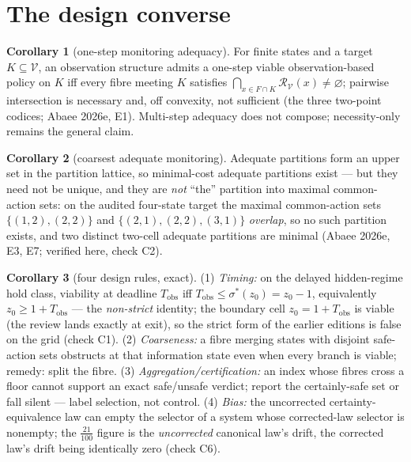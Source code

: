 \documentclass[10pt,twocolumn]{article}
\theoremstyle{definition}
\newtheorem{corollary}{Corollary}
\begin{document}
\section{The design converse}

\begin{corollary}[one-step monitoring adequacy]\label{cor:C}
For finite states and a target $K \subseteq \mathcal{V}$, an observation
structure admits a one-step viable observation-based policy on $K$ iff
every fibre meeting $K$ satisfies
$\bigcap_{x \in F \cap K} \mathcal{R}_{\mathcal{V}}(x) \neq \varnothing$;
pairwise intersection is necessary and, off convexity, not sufficient
(the three two-point codices; Abaee 2026e, E1). Multi-step adequacy does
not compose; necessity-only remains the general claim.
\end{corollary}

\begin{corollary}[coarsest adequate monitoring]\label{cor:coarsest}
Adequate partitions form an upper set in the partition lattice, so
minimal-cost adequate partitions exist --- but they need not be unique,
and they are \emph{not} ``the'' partition into maximal common-action
sets: on the audited four-state target the maximal common-action sets
$\{(1,2),(2,2)\}$ and $\{(2,1),(2,2),(3,1)\}$ \emph{overlap}, so no such
partition exists, and two distinct two-cell adequate partitions are
minimal (Abaee 2026e, E3, E7; verified here, check C2).
\end{corollary}

\begin{corollary}[four design rules, exact]\label{cor:D}
(1) \emph{Timing:} on the delayed hidden-regime hold class, viability at
deadline $T_{\mathrm{obs}}$ iff $T_{\mathrm{obs}} \le \sigma^{*}(z_0) =
z_0 - 1$, equivalently $z_0 \ge 1 + T_{\mathrm{obs}}$ --- the
\emph{non-strict} identity; the boundary cell $z_0 = 1 + T_{\mathrm{obs}}$
is viable (the review lands exactly at exit), so the strict form of the
earlier editions is false on the grid (check C1). (2) \emph{Coarseness:}
a fibre merging states with disjoint safe-action sets obstructs at that
information state even when every branch is viable; remedy: split the
fibre. (3) \emph{Aggregation/certification:} an index whose fibres cross
a floor cannot support an exact safe/unsafe verdict; report the
certainly-safe set or fall silent --- label selection, not control.
(4) \emph{Bias:} the uncorrected certainty-equivalence law can empty the
selector of a system whose corrected-law selector is nonempty; the
$\tfrac{21}{100}$ figure is the \emph{uncorrected} canonical law's drift,
the corrected law's drift being identically zero (check C6).
\end{corollary}
\end{document}
